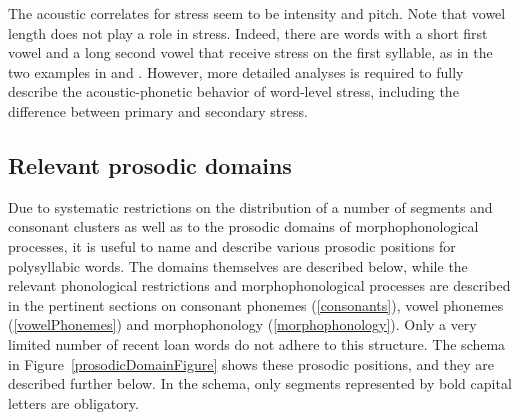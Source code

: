 The acoustic correlates for stress seem to be intensity and pitch. 
Note that vowel length does not play a role in stress. Indeed, there are words with a short first vowel and a long second vowel that receive stress on the first syllable, as in the two examples in  and .
However, more detailed analyses is required to fully describe the acous\-tic\--pho\-ne\-tic behavior of word-level stress, including the difference between primary and secondary stress. 


\subsection{Relevant prosodic domains}\label{prosodicDomains}
Due to systematic restrictions on the distribution of a number of segments and consonant clusters as well as to the prosodic domains of morphophonological processes, it is useful to name and describe various prosodic positions for polysyllabic words. The domains themselves are described below, while the relevant phonological restrictions and morphophonological processes are described in the pertinent sections on consonant phonemes (\SEC\ref{consonants}), vowel phonemes (\SEC\ref{vowelPhonemes}) and morphophonology (\SEC\ref{morphophonology}). Only a very limited number of recent loan words do not adhere to this structure. 
The schema in Figure~\vref{prosodicDomainFigure} shows these prosodic positions, and they are described further below. In the schema, only segments represented by bold capital letters are obligatory.
\newcommand{\Cyes}{\Bf{C}}
\newcommand{\Cno}{c}
\newcommand{\Vyes}{\Bf{V}}
\newcommand{\Vno}{v}
